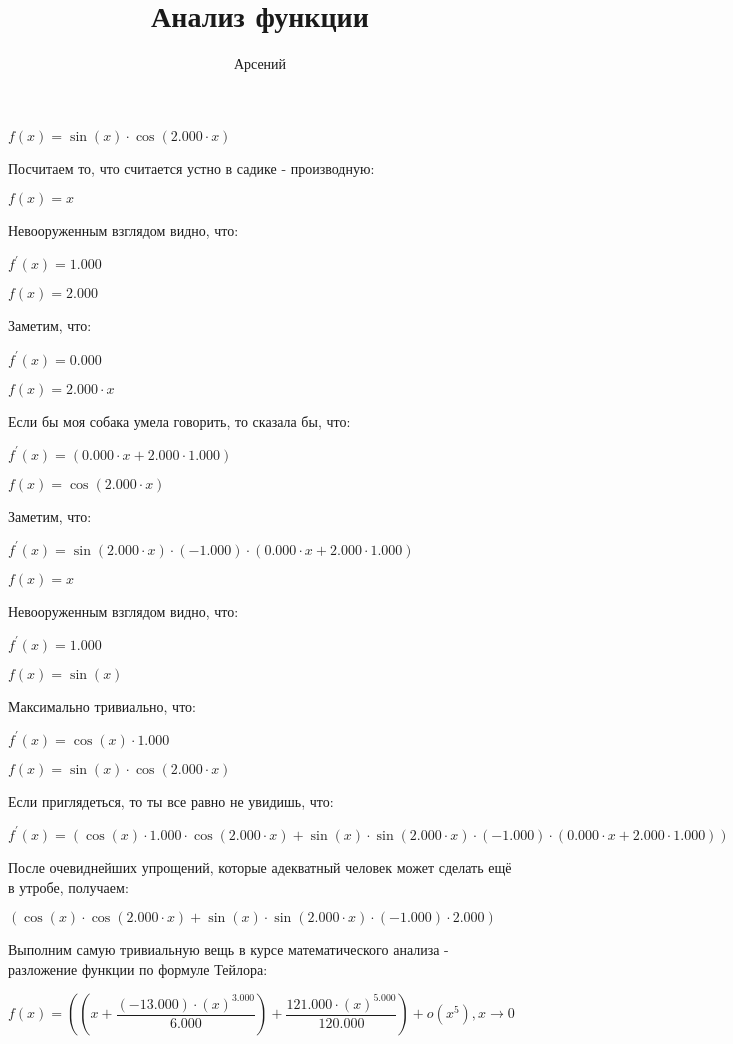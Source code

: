 \documentclass[a4paper,12pt]{article}
\author{\LARGEМерзляков Арсений}
\title{Анализ функции}
\begin{document}
\maketitle
\begin{flushleft}
\Large
$f(x) = \sin {(x)} \cdot \cos {(2.000 \cdot x)}$

Посчитаем то, что считается устно в садике - производную:

$f(x) = x$

Невооруженным взглядом видно, что:

$f^{'}(x) = 1.000$

$f(x) = 2.000$

Заметим, что:

$f^{'}(x) = 0.000$

$f(x) = 2.000 \cdot x$

Если бы моя собака умела говорить, то сказала бы, что:

$f^{'}(x) = (0.000 \cdot x+2.000 \cdot 1.000)$

$f(x) = \cos {(2.000 \cdot x)}$

Заметим, что:

$f^{'}(x) = \sin {(2.000 \cdot x)} \cdot (-1.000) \cdot (0.000 \cdot x+2.000 \cdot 1.000)$

$f(x) = x$

Невооруженным взглядом видно, что:

$f^{'}(x) = 1.000$

$f(x) = \sin {(x)}$

Максимально тривиально, что:

$f^{'}(x) = \cos {(x)} \cdot 1.000$

$f(x) = \sin {(x)} \cdot \cos {(2.000 \cdot x)}$

Если приглядеться, то ты все равно не увидишь, что:

$f^{'}(x) = (\cos {(x)} \cdot 1.000 \cdot \cos {(2.000 \cdot x)}+\sin {(x)} \cdot \sin {(2.000 \cdot x)} \cdot (-1.000) \cdot (0.000 \cdot x+2.000 \cdot 1.000))$

После очевиднейших упрощений, которые адекватный человек может сделать ещё в утробе, получаем:

$(\cos {(x)} \cdot \cos {(2.000 \cdot x)}+\sin {(x)} \cdot \sin {(2.000 \cdot x)} \cdot (-1.000) \cdot 2.000)$

Выполним самую тривиальную вещь в курсе математического анализа - разложение функции по формуле Тейлора: 

$f(x) = ((x+ \dfrac{(-13.000) \cdot (x)^{3.000}}{6.000} )+ \dfrac{121.000 \cdot (x)^{5.000}}{120.000} ) + o(x^{5}), x \rightarrow 0$

\end{flushleft}
\end{document}

